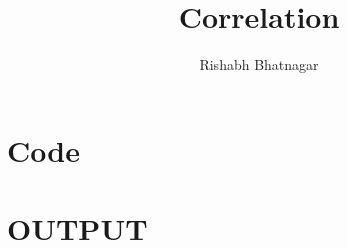 \documentclass[a4paper]{article}
\begin{document}
\title{Correlation}
\author{Rishabh Bhatnagar}
\maketitle

\section*{Code}


\newpage

\section*{OUTPUT}

\end{document}
